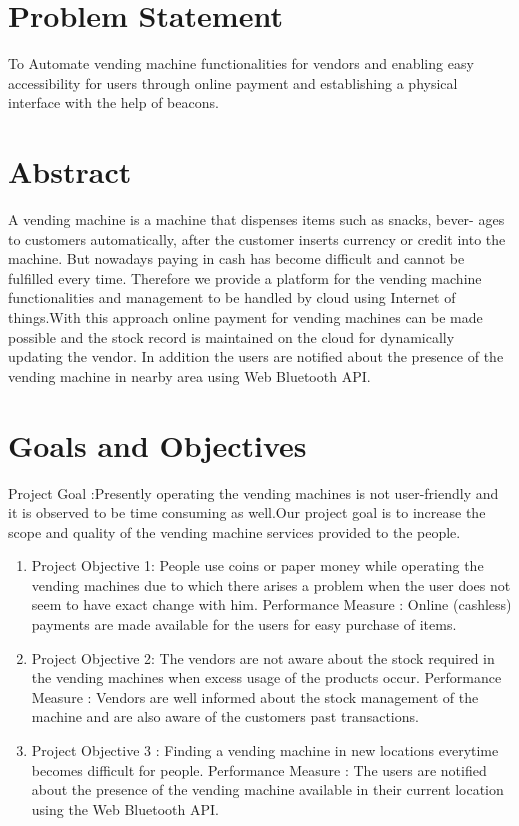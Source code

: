 \documentclass[oneside,a4paper,12pt]{report}
\begin{document}
\section{Problem Statement}
\label{sec:problem}
        To Automate vending machine functionalities for vendors and enabling easy accessibility for users through online payment and establishing a physical interface with the help of beacons. 
\section{Abstract}
A vending machine is a machine that dispenses items such as snacks, bever-
ages to customers automatically, after the customer inserts currency or credit
into the machine. But nowadays paying in cash has become difficult and cannot be fulfilled every time. Therefore we provide a platform for the vending machine functionalities and management to be handled by cloud using Internet of things.With this approach online payment for vending machines can be made possible and the
stock record is maintained on the cloud for dynamically updating the vendor.
In addition the users are notified about the presence of the vending
machine in nearby area  using Web Bluetooth API.
		    		   
\section{Goals and Objectives}
Project Goal :Presently operating the vending machines is not user-friendly and it is observed to be time consuming as well.Our project goal is to increase the scope and quality of the vending machine services provided to the people. 
\begin{enumerate}

\item Project Objective 1:
People use coins or paper money while operating the vending machines due to which there arises a problem when the user does not seem to have exact change with him.
Performance Measure :
Online (cashless) payments are made available for the users for easy purchase of items.
\item Project Objective 2:
The vendors are not aware about the stock required in the vending machines when excess usage of the products occur.
Performance Measure :
Vendors are well informed about the stock management of the machine and are also aware of the customers past transactions.
\item Project Objective 3 :
Finding a vending machine in new locations everytime becomes difficult for people.
Performance Measure :
The users are notified about the presence of the vending machine available in their current location using the Web Bluetooth API.

\end{enumerate}	
\end{document}
